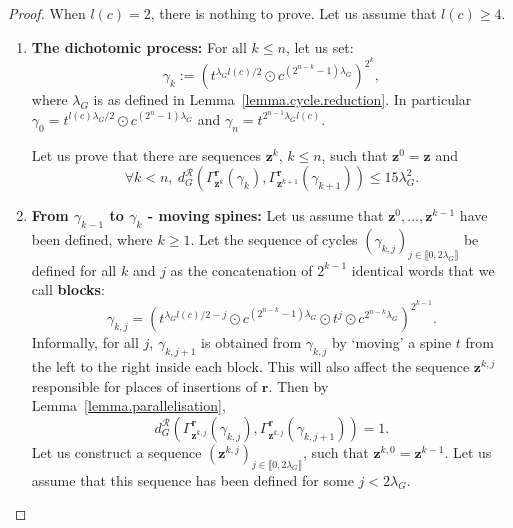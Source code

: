 \documentclass{article}
\begin{document}
\begin{proof}
When $l(c)=2$, there is nothing to prove. Let us assume that $l(c) \ge 4$.

\begin{enumerate}
\item \textbf{The dichotomic process:}
For all $k \le n$, let us set:
\[
\gamma_{k} := \left(t^{\lambda_G l(c)/2} \odot c^{\left(2^{n-k}-1\right) \lambda_G}\right)^{2^k},
\]
where $\lambda_G$ is as defined in Lemma~\ref{lemma.cycle.reduction}.
In particular $\gamma_0 = t^{l(c)\lambda_G /2}\odot c^{(2^n-1)\lambda_G}$ and $\gamma_n = t^{2^{n-1} \lambda_G l(c)}$.

Let us prove that there are sequences $\textbf{z}^k$, $k \le n$, such that $\textbf{z}^0 = \textbf{z}$ and
\[
\forall k<n,\ d_G^\mathcal{R}(\Gamma^{\textbf{r}}_{\textbf{z}^k}(\gamma_{k}),\Gamma^{\textbf{r}}_{\textbf{z}^{k+1}}(\gamma_{k+1})) \le { 15 \lambda_G ^2}.
\]
\item \textbf{From $\gamma_{k-1}$ to $\gamma_k$ - moving spines:} Let us assume that $\textbf{z}^0, \dots , \textbf{z}^{k-1}$ have been defined, where $k \ge 1$. Let the sequence of cycles $(\gamma_{k,j})_{j \in\llbracket 0 ,2\lambda_G \rrbracket}$ be defined for all $k$ and $j$ as the concatenation of $2^{k-1}$ identical words that we call \textbf{blocks}:
\[
\gamma_{k,j} =\left(t^{\lambda_G l(c)/2-j} \odot c^{\left(2^{n-k}-1\right)\lambda_G} \odot t^j \odot c^{2^{n-k}\lambda_G} \right)^{2^{k-1}}.
\]
Informally, for all $j$, $\gamma_{k,j+1}$ is obtained from  $\gamma_{k,j}$ by `moving' a spine $t$ from the left to the right inside each block. This will also affect the sequence $\textbf{z}^{k,j}$ responsible for places of insertions of $\mathbf{r}$. Then by Lemma~\ref{lemma.parallelisation},
\[d^{\mathcal{R}}_G\left(\Gamma^{\textbf{r}}_{\textbf{z}^{k,j}}(\gamma_{k,j}), \Gamma^{\textbf{r}}_{\textbf{z}^{k,j}}(\gamma_{k,j+1})\right) = 1.\]
Let us construct a sequence $\left(\textbf{z}^{k,j}\right)_{j \in\llbracket 0 ,2\lambda_G \rrbracket}$, such that $\textbf{z}^{k,0} = \textbf{z}^{k-1}$. Let us assume that this sequence has been defined for some $j < 2\lambda_G$. 


\end{enumerate}
\end{proof}
\end{document}
